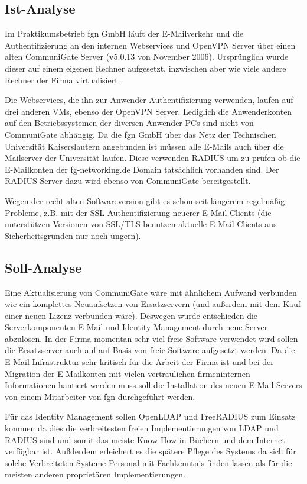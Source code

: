 \documentclass[11pt,a4paper,titlepage=firstiscover]{scrartcl} %
\begin{document}
\subsection{Ist-Analyse}
Im Praktikumsbetrieb fgn GmbH l\"auft der E-Mailverkehr und die Authentifizierung an den internen Webservices und OpenVPN Server \"uber einen alten CommuniGate Server (v5.0.13 von November 2006). Urspr\"unglich wurde dieser auf einem eigenen Rechner aufgesetzt, inzwischen aber wie viele andere Rechner der Firma virtualisiert. 

Die Webservices, die ihn zur Anwender-Authentifizierung verwenden, laufen auf drei anderen VMs, ebenso der OpenVPN Server. Lediglich die Anwenderkonten auf den Betriebssystemen der diversen Anwender-PCs sind nicht von CommuniGate abh\"angig. Da die fgn GmbH \"uber das Netz der Technischen Universit\"at Kaiserslautern angebunden ist m\"ussen alle E-Mails auch \"uber die Mailserver der Universit\"at laufen. Diese verwenden RADIUS um zu pr\"ufen ob die E-Mailkonten der fg-networking.de Domain tats\"achlich vorhanden sind. Der RADIUS Server dazu wird ebenso von CommuniGate bereitgestellt. 

Wegen der recht alten Softwareversion gibt es schon seit l\"angerem regelm\"a\ss{}ig Probleme, z.B. mit der SSL Authentifizierung neuerer E-Mail Clients (die unterst\"utzen Versionen von SSL/TLS benutzen aktuelle E-Mail Clients aus Sicherheitsgr\"unden nur noch ungern).


\subsection{Soll-Analyse}
Eine Aktualisierung von CommuniGate w\"are mit \"ahnlichem Aufwand verbunden wie ein komplettes Neuaufsetzen von Ersatzservern (und au\ss{}erdem mit dem Kauf einer neuen Lizenz verbunden w\"are). Deswegen wurde entschieden die Serverkomponenten E-Mail und Identity Management durch neue Server abzul\"osen. In der Firma momentan sehr viel freie Software verwendet wird sollen die Ersatzserver auch auf auf Basis von freie Software aufgesetzt werden. Da die E-Mail Infrastruktur sehr kritisch f\"ur die Arbeit der Firma ist und bei der Migration der E-Mailkonten mit vielen vertraulichen firmeninternen Informationen hantiert werden muss soll die Installation des neuen E-Mail Servers von einem Mitarbeiter von fgn durchgef\"uhrt werden.

F\"ur das Identity Management sollen OpenLDAP und FreeRADIUS zum Einsatz kommen da dies die verbreitesten freien Implementierungen von LDAP und RADIUS sind und somit das meiste Know How in B\"uchern und dem Internet verf\"ugbar ist. Au\ss{}derdem erleichert es die sp\"atere Pflege des Systems da sich f\"ur solche Verbreiteten Systeme Personal mit Fachkenntnis finden lassen als f\"ur die meisten anderen propriet\"aren Implementierungen.
\end{document}
